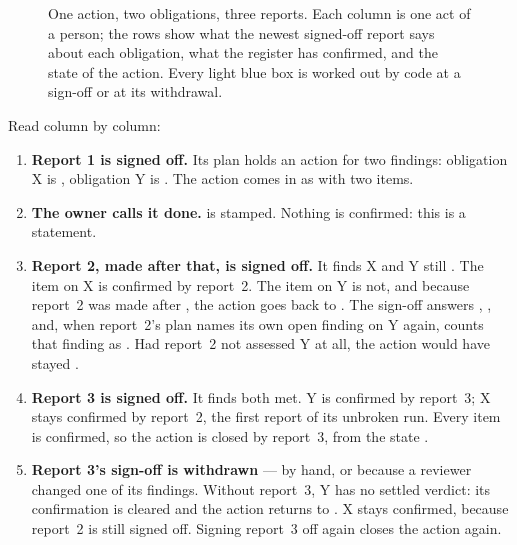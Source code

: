 \begin{figure}[H]
\actorlegend
\caption{One action, two obligations, three reports. Each column is one act of a person;
the rows show what the newest signed-off report says about each obligation, what the
register has confirmed, and the state of the action. Every light blue box is worked out by
code at a sign-off or at its withdrawal.}\label{fig:register:timeline}
\end{figure}

Read column by column:

\begin{enumerate}
  \item \textbf{Report 1 is signed off.} Its plan holds an action for two findings: obligation
    X is , obligation Y is . The action comes in as
     with two items.
  \item \textbf{The owner calls it done.}  is stamped. Nothing is confirmed:
    this is a statement.
  \item \textbf{Report 2, made after that, is signed off.} It finds X  and Y still
    . The item on X is confirmed by report~2. The item on Y is not, and because
    report~2 was made after , the action goes back to . The
    sign-off answers , , and, when report~2's plan names its
    own open finding on Y again, counts that finding as . Had report~2 not assessed Y at all, the action would have
    stayed .
  \item \textbf{Report 3 is signed off.} It finds both met. Y is confirmed by report~3; X stays
    confirmed by report~2, the first report of its unbroken run. Every item is confirmed, so
    the action is closed by report~3, from the state .
  \item \textbf{Report 3's sign-off is withdrawn} --- by hand, or because a reviewer changed
    one of its findings. Without report~3, Y has no settled verdict: its confirmation is
    cleared and the action returns to . X stays confirmed, because report~2
    is still signed off. Signing report~3 off again closes the action again.
\end{enumerate}

